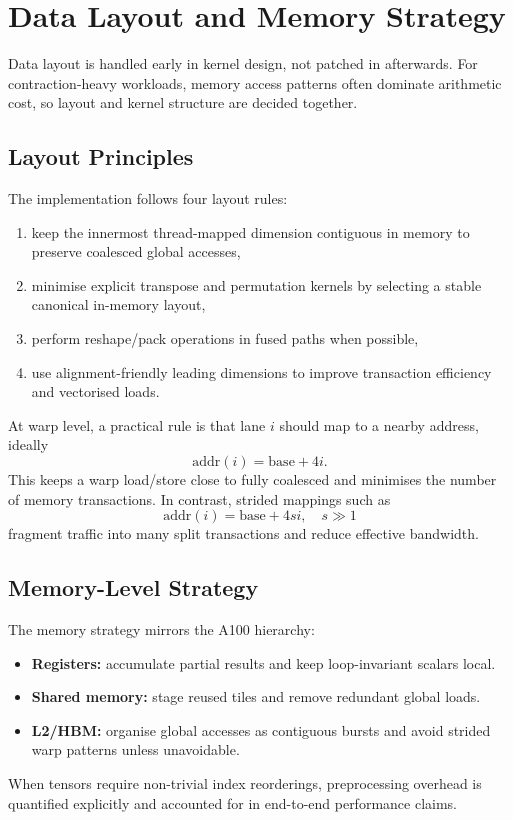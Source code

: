 \section{Data Layout and Memory Strategy}\label{sec:data-layout}

Data layout is handled early in kernel design, not patched in afterwards.
For contraction-heavy workloads, memory access patterns often dominate
arithmetic cost, so layout and kernel structure are decided together.

\subsection{Layout Principles}

The implementation follows four layout rules:

\begin{enumerate}
  \item keep the innermost thread-mapped dimension contiguous in memory to
    preserve coalesced global accesses,
  \item minimise explicit transpose and permutation kernels by selecting a
    stable canonical in-memory layout,
  \item perform reshape/pack operations in fused paths when possible,
  \item use alignment-friendly leading dimensions to improve transaction
    efficiency and vectorised loads.
\end{enumerate}

At warp level, a practical rule is that lane $i$ should map to a nearby
address, ideally
\[
  \mathrm{addr}(i)=\mathrm{base}+4i.
\]
This keeps a warp load/store close to fully coalesced and minimises the number
of memory transactions. In contrast, strided mappings such as
\[
  \mathrm{addr}(i)=\mathrm{base}+4si,\quad s\gg 1
\]
fragment traffic into many split transactions and reduce effective bandwidth.

\subsection{Memory-Level Strategy}

The memory strategy mirrors the A100 hierarchy:

\begin{itemize}
  \item \textbf{Registers:} accumulate partial results and keep loop-invariant
    scalars local.
  \item \textbf{Shared memory:} stage reused tiles and remove redundant global
    loads.
  \item \textbf{L2/HBM:} organise global accesses as contiguous bursts and avoid
    strided warp patterns unless unavoidable.
\end{itemize}

When tensors require non-trivial index reorderings, preprocessing overhead is
quantified explicitly and accounted for in end-to-end performance claims.
